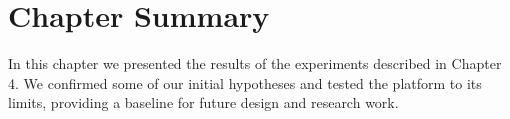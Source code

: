 

\section{Chapter Summary}

In this chapter we presented the results of the experiments described in Chapter
4. We confirmed some of our initial hypotheses and tested the platform to its
limits, providing a baseline for future design and research work.
